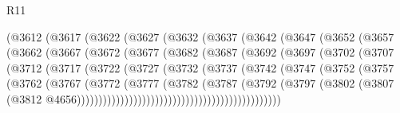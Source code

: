\begin{lexlean}{R11}
\begin{coremodule}
                (@3612
                  (@3617
                    (@3622
                      (@3627
                        (@3632
                          (@3637
                            (@3642
                              (@3647
                                (@3652
                                  (@3657
                                    (@3662
                                      (@3667
                                        (@3672
                                          (@3677
                                            (@3682
                                              (@3687
                                                (@3692
                                                  (@3697
                                                    (@3702
                                                      (@3707
                                                        (@3712
                                                          (@3717
                                                            (@3722
                                                              (@3727
                                                                (@3732
                                                                  (@3737
                                                                    (@3742
                                                                      (@3747
                                                                        (@3752
                                                                          (@3757
                                                                            (@3762
                                                                              (@3767
                                                                                (@3772
                                                                                  (@3777
                                                                                    (@3782
                                                                                      (@3787
                                                                                        (@3792
                                                                                          (@3797
                                                                                            (@3802
                                                                                              (@3807
                                                                                                (@3812
                                                                                                  @4656)))))))))))))))))))))))))))))))))))))))))))))))

\end{coremodule}
\end{lexlean}
